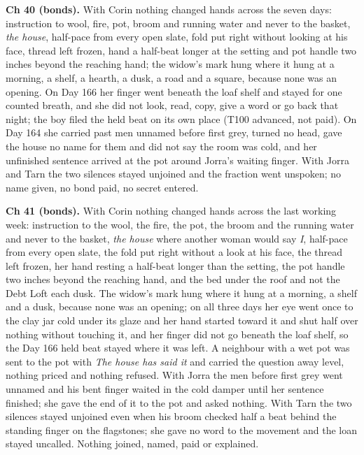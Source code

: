 \documentclass{design/chronicle}
\begin{document}
{\textbf{Ch 40 (bonds).} With Corin nothing changed hands across the seven days: instruction to wool, fire, pot, broom and running water and never to the basket, \emph{the house}, half-pace from every open slate, fold put right without looking at his face, thread left frozen, hand a half-beat longer at the setting and pot handle two inches beyond the reaching hand; the widow’s mark hung where it hung at a morning, a shelf, a hearth, a dusk, a road and a square, because none was an opening. On Day 166 her finger went beneath the loaf shelf and stayed for one counted breath, and she did not look, read, copy, give a word or go back that night; the boy filed the held beat on its own place (T100 advanced, not paid). On Day 164 she carried past men unnamed before first grey, turned no head, gave the house no name for them and did not say the room was cold, and her unfinished sentence arrived at the pot around Jorra’s waiting finger. With Jorra and Tarn the two silences stayed unjoined and the fraction went unspoken; no name given, no bond paid, no secret entered.

\textbf{Ch 41 (bonds).} With Corin nothing changed hands across the last working week: instruction to the wool, the fire, the pot, the broom and the running water and never to the basket, \emph{the house} where another woman would say \emph{I}, half-pace from every open slate, the fold put right without a look at his face, the thread left frozen, her hand resting a half-beat longer than the setting, the pot handle two inches beyond the reaching hand, and the bed under the roof and not the Debt Loft each dusk. The widow’s mark hung where it hung at a morning, a shelf and a dusk, because none was an opening; on all three days her eye went once to the clay jar cold under its glaze and her hand started toward it and shut half over nothing without touching it, and her finger did not go beneath the loaf shelf, so the Day 166 held beat stayed where it was left. A neighbour with a wet pot was sent to the pot with \emph{The house has said it} and carried the question away level, nothing priced and nothing refused. With Jorra the men before first grey went unnamed and his bent finger waited in the cold damper until her sentence finished; she gave the end of it to the pot and asked nothing. With Tarn the two silences stayed unjoined even when his broom checked half a beat behind the standing finger on the flagstones; she gave no word to the movement and the loan stayed uncalled. Nothing joined, named, paid or explained.

}
\end{document}
